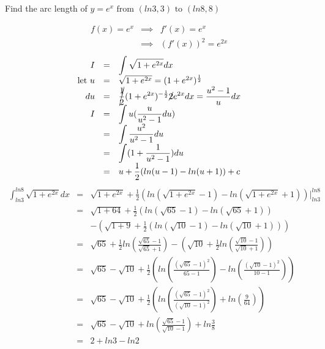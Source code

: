 \begin{eg}
Find the arc length of \(y = e^x \text{ from } (ln3, 3) \text{ to } (ln8, 8)\)

\soln
\[\begin{array}{rcl}
f(x) = e^x & \implies & f'(x) = e^x\\
& \implies & (f'(x))^2 = e^{2x}
\end{array}\]
\[\begin{array}{rcl}
I & = & \displaystyle \int \sqrt{1 + e^{2x}}dx\\
\text{let } u & = & \sqrt{1 + e^{2x}} = (1 + e^{2x})^{\frac{1}{2}}\\
du & = & \displaystyle \cancel{\frac{1}{2}} (1 + e^{2x})^{-\frac{1}{2}} \cancel{2} e^{2x} dx = \frac{u^2 - 1}{u} dx\\
I & = & \displaystyle \int u (\frac{u}{u^2 - 1}du)\\
& = & \displaystyle \int \frac{u^2}{u^2 - 1} du\\
& = & \displaystyle \int (1 + \frac{1}{u^2 - 1})du\\
& = & \displaystyle u + \frac{1}{2}(ln(u - 1) - ln(u + 1)) + c
\end{array}\]
\[\begin{array}{rcl}
\displaystyle \int^{ln8}_{ln3} \sqrt{1 + e^{2x}}dx & = & \displaystyle \sqrt{1 + e^{2x}} + \frac{1}{2}(ln( \sqrt{1 + e^{2x}} -1) - ln(\sqrt{1 + e^{2x}} + 1))\Big|^{ln8}_{ln3}\\
& = & \displaystyle \sqrt{1 + 64} + \frac{1}{2} (ln(\sqrt{65} - 1) - ln(\sqrt{65} + 1))\\
&& \displaystyle - (\sqrt{1 + 9} + \frac{1}{2} (ln(\sqrt{10} - 1) - ln(\sqrt{10} + 1)))\\
& = & \displaystyle \sqrt{65} + \frac{1}{2}ln(\frac{\sqrt{65} - 1}{\sqrt{65} + 1}) - (\sqrt{10} + \frac{1}{2} ln(\frac{\sqrt{10} - 1}{\sqrt{10} + 1}))\\
& = & \displaystyle \sqrt{65} - \sqrt{10} + \frac{1}{2}(ln (\frac{(\sqrt{65} - 1)^2}{65 -1}) - ln (\frac{(\sqrt{10} - 1)^2}{10 - 1}))\\
& = & \displaystyle \sqrt{65} - \sqrt{10} + \frac{1}{2} (ln (\frac{(\sqrt{65} - 1)^2}{(\sqrt{10} -1)^2}) + ln (\frac{9}{64}))\\
& = & \displaystyle \sqrt{65} - \sqrt{10} + ln(\frac{\sqrt{65} - 1}{\sqrt{10} - 1}) + ln \frac{3}{8}\\
& = & 2 + ln3 - ln2
\end{array}\]
\end{eg}
